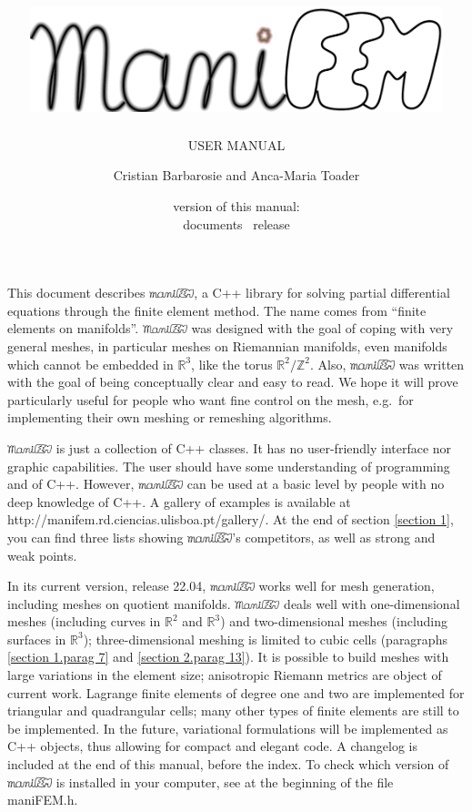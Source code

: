 \documentclass[a4paper]{scrreprt}
\title{\includegraphics[width=12cm]{manifem-grey-capital.eps}}
\subtitle{USER MANUAL}
\author{Cristian Barbarosie and Anca-Maria Toader}
\date{\small version of this manual: \manualversion\\ documents \maniFEM\ release \manifemrelease}
\def\manifemrelease{22.04}
\def\numb{}
\newcommand\ManiFEM{\leavevmode\hbox{\includegraphics[width=13mm]{manifem-large}}}
\newcommand\maniFEM{\leavevmode\hbox{\includegraphics[width=13mm]{manifem-small}}}
\renewcommand\tt{\normalfont\ttfamily}
\begin{document}
\begin{titlepage}
\maketitle
\end{titlepage}



\chapter*{}

This document describes \maniFEM, a {\tt C++} library for solving partial differential equations
through the finite element method.
The name comes from ``finite elements on manifolds''. 
{\ManiFEM} was designed with the goal of coping with very general meshes,
in particular meshes on Riemannian manifolds, even manifolds which cannot be embedded
in $ {\mathbb R}^3 $, like the torus $ {\mathbb R}^2/{\mathbb Z}^2 $.
Also, {\maniFEM} was written with the goal of being conceptually clear
and easy to read.
We hope it will prove particularly useful for people who want fine control on the mesh,
e.g.\ for implementing their own meshing or remeshing algorithms.

{\ManiFEM} is just a collection of {\tt C++} classes.
It has no user-friendly interface nor graphic capabilities.
The user should have some understanding of programming and of {\tt C++}.
However, {\maniFEM} can be used at a basic level by people with no deep knowledge of
{\tt C++}.
A gallery of examples is available at {\small\tt http://manifem.rd.ciencias.ulisboa.pt/gallery/}.
At the end of section \ref{\numb section 1}, you can find three lists showing
{\maniFEM}'s competitors, as well as strong and weak points.

In its current version, release \manifemrelease, {\maniFEM} works well for mesh generation,
including meshes on quotient manifolds.
{\ManiFEM} deals well with one-dimensional meshes (including curves in $ {\mathbb R}^2 $ and
$ {\mathbb R}^3 $) and two-dimensional meshes (including surfaces in $ {\mathbb R}^3 $);
three-dimensional meshing is limited to cubic cells
(paragraphs \ref{\numb section 1.\numb parag 7} and \ref{\numb section 2.\numb parag 13}).
It is possible to build meshes with large variations in the element size;
anisotropic Riemann metrics are object of current work.
Lagrange finite elements of degree one and two are implemented for triangular and quadrangular
cells; many other types of finite elements are still to be implemented.
In the future, variational formulations will be implemented as {\tt C++} objects,
thus allowing for compact and elegant code.
A changelog is included at the end of this manual, before the index.
To check which version of {\maniFEM} is installed in your computer,
see at the beginning of the file {\small\tt maniFEM.h}.
\end{document}
